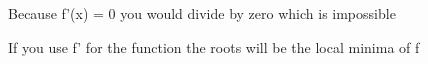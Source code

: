 \documentclass[12pt]{article}
\newenvironment{exercise}[2][Exercise]{\begin{trivlist}
\item[\hskip \labelsep {\bfseries #1}\hskip \labelsep {\bfseries #2.}]}{\end{trivlist}}
\newenvironment{question}[2][Question]{\begin{trivlist}
\item[\hskip \labelsep {\bfseries #1}\hskip \labelsep {\bfseries #2.}]}{\end{trivlist}}
\begin{document}
\begin{exercise}
3
\begin{question}
b
Because f'(x) = 0 you would divide by zero which is impossible
\end{question}

\begin{question}
c
If you use f' for the function the roots will be the local minima of f
\end{question}


\end{exercise}

 
\end{document}
